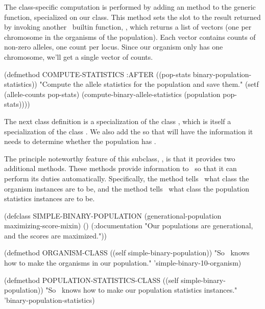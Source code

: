 {\filbreak

The  class-specific computation is performed
by adding an  method to the
 generic function, specialized on our class.
This method sets the  slot to the result returned by invoking another
\geco\ builtin function, , which returns a list of
vectors (one per chromosome in the organisms of the population). Each vector contains
counts of non-zero alleles, one count per locus. Since our organism only has one
chromosome, we'll get a single vector of counts.
\begin{clcode}(defmethod COMPUTE-STATISTICS :AFTER
           ((pop-stats binary-population-statistics))
  {\sf "Compute the allele statistics for the population and save them."}
  (setf (allele-counts pop-stats)
        (compute-binary-allele-statistics (population pop-stats))))\end{clcode}

\filbreak

The next class definition is a specialization of the class
, which is itself a specialization of the class
. We also add the  so that
 will have the information it needs to determine whether the
population has .

The principle noteworthy feature of this subclass,
, is that it provides two additional methods. These
methods provide information to \geco\ so that it can perform its duties
automatically. Specifically, the  method tells \geco\ what
class the organism instances are to be, and the
 method tells \geco\ what class the population
statistics instances are to be.
\begin{clcode}(defclass SIMPLE-BINARY-POPULATION
          (generational-population maximizing-score-mixin)
  ()
  (:documentation
   {\sf "Our populations are generational, and the scores are maximized."}))

(defmethod ORGANISM-CLASS ((self simple-binary-population))
  {\sf "So \geco\ knows how to make the organisms in our population."}
  'simple-binary-10-organism)

(defmethod POPULATION-STATISTICS-CLASS
           ((self simple-binary-population))
  {\sf "So \geco\ knows how to make our population statistics instances."}
  'binary-population-statistics)\end{clcode}

}
